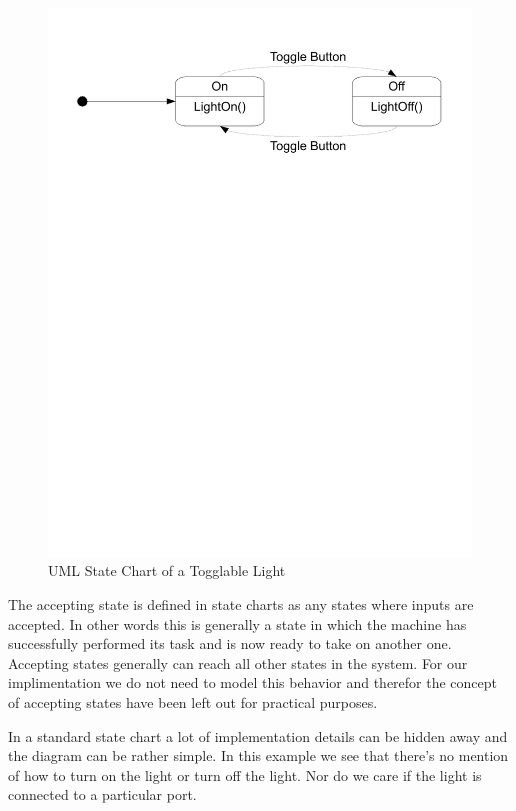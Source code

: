 \begin{figure}[htp]
    \centering
    \includegraphics[trim= 15mm 200mm 15mm 10mm, clip ,width=\imgmedium]{./images/state_uml_light.pdf} 
    \caption{UML State Chart of a Togglable Light}
    \label{fig:state_uml_light}
\end{figure}

The accepting state is defined in state charts as any states where inputs are accepted. In other words this is generally a state in which the machine has successfully performed its task and is now ready to take on another one. Accepting states generally can reach all other states in the system. For our implimentation we do not need to model this behavior and therefor the concept of accepting states have been left out for practical purposes.

In a standard state chart a lot of implementation details can be hidden away and the diagram can be rather simple. In this example we see that there's no mention of how to turn on the light or turn off the light. Nor do we care if the light is connected to a particular port.

